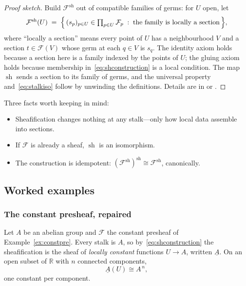 \begin{proof}[Proof sketch]
  Build $\mathcal{F}^{\mathrm{sh}}$ out of compatible families of
  germs: for $U$ open, let
  \begin{equation}
    \label{eq:shconstruction}
    \mathcal{F}^{\mathrm{sh}}(U) \;=\;
    \Bigl\{\, (s_p)_{p \in U} \in \textstyle\prod_{p \in U} \mathcal{F}_p
    \;:\; \text{the family is locally a section} \,\Bigr\},
  \end{equation}
  where \enquote{locally a section} means every point of $U$ has a
  neighbourhood $V$ and a section $t \in \mathcal{F}(V)$ whose germ at
  each $q \in V$ is $s_q$. The identity axiom holds because a section
  here is a family indexed by the points of $U$; the gluing axiom holds
  because membership in~\eqref{eq:shconstruction} is a local condition.
  The map $\operatorname{sh}$ sends a section to its family of germs,
  and the universal property and~\eqref{eq:stalkiso} follow by unwinding
  the definitions. Details are in
  \textcite[Section~II.1]{hartshorne1977} or \textcite{vakil2017}.
\end{proof}

Three facts worth keeping in mind:
\begin{itemize}
  \item Sheafification changes nothing at any stalk---only how local
        data assemble into sections.
  \item If $\mathcal{F}$ is already a sheaf, $\operatorname{sh}$ is an
        isomorphism.
  \item The construction is idempotent:
        $(\mathcal{F}^{\mathrm{sh}})^{\mathrm{sh}}
        \cong \mathcal{F}^{\mathrm{sh}}$, canonically.
\end{itemize}

\subsection{Worked examples}
\label{sec:worked}

\subsubsection{The constant presheaf, repaired}
\label{sec:constant-repaired}

Let $A$ be an abelian group and $\mathcal{F}$ the constant presheaf of
Example~\ref{ex:constpre}. Every stalk is $A$, so
by~\eqref{eq:shconstruction} the sheafification is the sheaf of
\emph{locally constant} functions $U \to A$, written $\underline{A}$.
On an open subset of $\mathbb{R}$ with $n$ connected components,
\begin{equation}
  \label{eq:components}
  \underline{A}(U) \cong A^{\,n},
\end{equation}
one constant per component.

